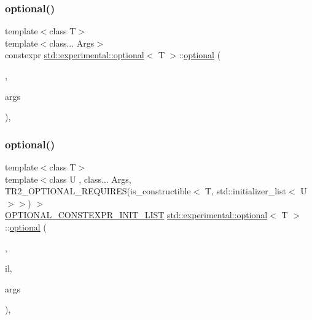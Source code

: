 \subsubsection{\texorpdfstring{optional()}{optional()}\hspace{0.1cm}{\footnotesize\ttfamily [7/8]}}
{\footnotesize\ttfamily template$<$class T$>$ \\
template$<$class... Args$>$ \\
constexpr \mbox{\hyperlink{classstd_1_1experimental_1_1optional}{std\+::experimental\+::optional}}$<$ T $>$\+::\mbox{\hyperlink{classstd_1_1experimental_1_1optional}{optional}} (\begin{DoxyParamCaption}\item[{\mbox{\hyperlink{structstd_1_1experimental_1_1in__place__t}{in\+\_\+place\+\_\+t}}}]{,  }\item[{Args \&\&...}]{args }\end{DoxyParamCaption})\hspace{0.3cm}{\ttfamily [inline]}, {\ttfamily [explicit]}}

\mbox{\label{classstd_1_1experimental_1_1optional_a52252028f9d99a680f7059ff48593985}} 
\subsubsection{\texorpdfstring{optional()}{optional()}\hspace{0.1cm}{\footnotesize\ttfamily [8/8]}}
{\footnotesize\ttfamily template$<$class T$>$ \\
template$<$class U , class... Args, T\+R2\+\_\+\+O\+P\+T\+I\+O\+N\+A\+L\+\_\+\+R\+E\+Q\+U\+I\+R\+E\+S(is\+\_\+constructible$<$ T, std\+::initializer\+\_\+list$<$ U $>$$>$) $>$ \\
\mbox{\hyperlink{optional_8h_a7399114ed1c146a67741cdd1f681fcb5}{O\+P\+T\+I\+O\+N\+A\+L\+\_\+\+C\+O\+N\+S\+T\+E\+X\+P\+R\+\_\+\+I\+N\+I\+T\+\_\+\+L\+I\+ST}} \mbox{\hyperlink{classstd_1_1experimental_1_1optional}{std\+::experimental\+::optional}}$<$ T $>$\+::\mbox{\hyperlink{classstd_1_1experimental_1_1optional}{optional}} (\begin{DoxyParamCaption}\item[{\mbox{\hyperlink{structstd_1_1experimental_1_1in__place__t}{in\+\_\+place\+\_\+t}}}]{,  }\item[{std\+::initializer\+\_\+list$<$ U $>$}]{il,  }\item[{Args \&\&...}]{args }\end{DoxyParamCaption})\hspace{0.3cm}{\ttfamily [inline]}, {\ttfamily [explicit]}}

